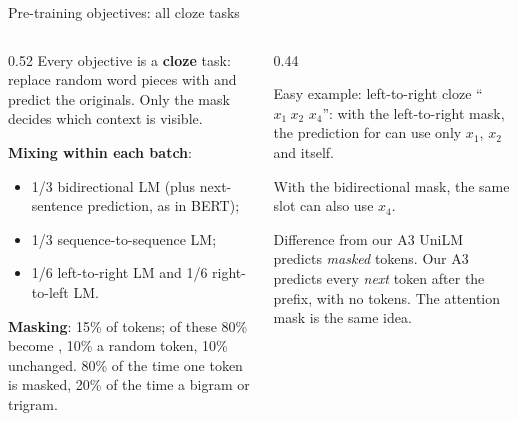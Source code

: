 \documentclass[aspectratio=169,11pt]{beamer}
\begin{document}
\begin{frame}{Pre-training objectives: all cloze tasks}
  \begin{columns}[T]
    \begin{column}{0.52\textwidth}
      \small
      Every objective is a \textbf{cloze} task: replace random word pieces with \code{[MASK]} and predict the originals. Only the mask decides which context is visible.
      \vspace{1mm}

      \textbf{Mixing within each batch}:
      \begin{itemize}
        \item 1/3 bidirectional LM (plus next-sentence prediction, as in BERT);
        \item 1/3 sequence-to-sequence LM;
        \item 1/6 left-to-right LM and 1/6 right-to-left LM.
      \end{itemize}
      \textbf{Masking}: 15\% of tokens; of these 80\% become \code{[MASK]}, 10\% a random token, 10\% unchanged. 80\% of the time one token is masked, 20\% of the time a bigram or trigram.
    \end{column}
    \begin{column}{0.44\textwidth}
      \begin{exampleblock}{Easy example: left-to-right cloze}
        \small
        ``$x_1\ x_2$ \code{[MASK]} $x_4$'': with the left-to-right mask, the prediction for \code{[MASK]} can use only $x_1$, $x_2$ and itself.
        \vspace{1mm}

        With the bidirectional mask, the same slot can also use $x_4$.
      \end{exampleblock}
      \begin{alertblock}{Difference from our A3}
        \small
        UniLM predicts \emph{masked} tokens. Our A3 predicts every \emph{next} token after the prefix, with no \code{[MASK]} tokens. The attention mask is the same idea.
      \end{alertblock}
    \end{column}
  \end{columns}
\end{frame}
\end{document}
